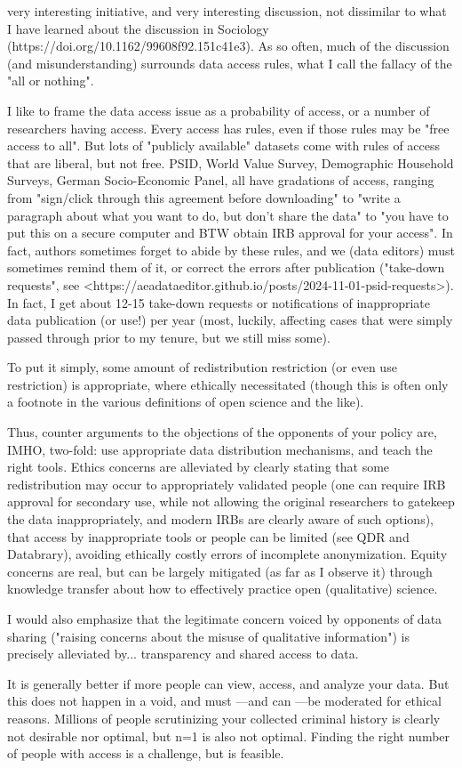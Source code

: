 
very interesting initiative, and very interesting discussion, not dissimilar to what I have learned about the discussion in Sociology (https://doi.org/10.1162/99608f92.151c41e3). As so often, much of the discussion (and misunderstanding) surrounds data access rules, what I call the fallacy of the "all or nothing".

I like to frame the data access issue as a probability of access, or a number of researchers having access. Every access has rules, even if those rules may be "free access to all". But lots of "publicly available" datasets come with rules of access that are liberal, but not free. PSID, World Value Survey, Demographic Household Surveys, German Socio-Economic Panel, all have gradations of access, ranging from "sign/click through this agreement before downloading"  to "write a paragraph about what you want to do, but don't share the data"  to "you have to put this on a secure computer and BTW obtain IRB approval for your access". In fact, authors sometimes forget to abide by these rules, and we (data editors) must sometimes remind them of it, or correct the errors after publication ("take-down requests", see <https://aeadataeditor.github.io/posts/2024-11-01-psid-requests>). In fact, I get about 12-15 take-down requests or notifications of inappropriate data publication (or use!) per year (most, luckily, affecting cases that were simply passed through prior to my tenure, but we still miss some).

To put it simply, some amount of redistribution restriction (or even use restriction) is appropriate, where ethically necessitated (though this is often only a footnote in the various definitions of open science and the like).

Thus, counter arguments to the objections of the opponents of your policy are, IMHO, two-fold: use appropriate data distribution mechanisms, and teach the right tools. Ethics concerns are alleviated by clearly stating that some redistribution may occur to appropriately validated people (one can require IRB approval for secondary use, while not allowing the original researchers to gatekeep the data inappropriately, and modern IRBs are clearly aware of such options), that access by inappropriate tools or people can be limited (see QDR and Databrary), avoiding ethically costly errors of incomplete anonymization. Equity concerns are real, but can be largely mitigated (as far as I observe it) through knowledge transfer about how to effectively practice open (qualitative) science.

I would also emphasize that the legitimate concern voiced by opponents of data sharing ("raising concerns about the misuse of qualitative information") is precisely alleviated by... transparency and shared access to data.

It is generally better if more people can view, access, and analyze your data. But this does not happen in a void, and must —and can —be moderated for ethical reasons. Millions of people scrutinizing your collected criminal history is clearly not desirable nor optimal, but n=1 is also not optimal. Finding the right number of people with access is a challenge, but is feasible.